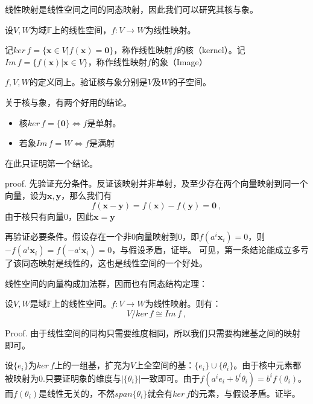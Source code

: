 

\begin{issues}
\issueTODO
\end{issues}

线性映射是线性空间之间的同态映射，因此我们可以研究其核与象。
\begin{definition}{}
设$V,W$为域$\mathbb F$上的线性空间，$f:V\rightarrow W$为线性映射。

记$ker\,f=\{\boldsymbol x\in V|f(\boldsymbol x)=\boldsymbol 0\}$，称作线性映射$f$的核（kernel）。记$Im\,f=\{f(\boldsymbol x)|\boldsymbol x\in V\}$，称作线性映射$f$的象（Image）
\end{definition}
\begin{exercise}{}
$f,V,W$的定义同上。验证核与象分别是$V$及$W$的子空间。
\end{exercise}
关于核与象，有两个好用的结论。
\begin{itemize}
\item 核$ker\,f=\{\boldsymbol 0\}\Longleftrightarrow f$是单射。
\item 若象$Im\,f=W\Longleftrightarrow f$是满射
\end{itemize}
在此只证明第一个结论。

proof.
先验证充分条件。反证该映射并非单射，及至少存在两个向量映射到同一个向量，设为$\boldsymbol{x,y}$，那么我们有
\begin{equation}
f(\boldsymbol{x}-\boldsymbol{y})=f(\boldsymbol x)-f(\boldsymbol y)=\boldsymbol 0~,
\end{equation}
由于核只有向量$0$，因此$\boldsymbol {x}=\boldsymbol{y}$

再验证必要条件。假设存在一个非$0$向量映射到$0$，即$f(a^i\boldsymbol x_i)=0$，则$-f(a^i\boldsymbol x_i)=f(-a^i\boldsymbol x_i)=0$，与假设矛盾，证毕。
可见，第一条结论能成立多亏了该同态映射是线性的，这也是线性空间的一个好处。

线性空间的向量构成加法群，因而也有同态结构定理：
\begin{theorem}{}
设$V,W$是域$\mathbb F$上的线性空间。$f:V\rightarrow W$为线性映射。则有：
\begin{equation}
V/ker \,f\cong Im\,f~,
\end{equation}
\end{theorem}
Proof.
由于线性空间的同构只需要维度相同，所以我们只需要构建基之间的映射即可。

设$\{e_i\}$为$ker\,f$上的一组基，扩充为$V$上全空间的基：$\{e_i\}\cup \{\theta_i\}$。由于核中元素都被映射为0.只要证明象的维度与$|\{\theta_i\}|$一致即可。由于$f(a^ie_i+b^i\theta_i)=b^if(\theta_i)$。而$f(\theta_i)$是线性无关的，不然$span\{\theta_i\}$就会有$ker\,f$的元素，与假设矛盾。证毕。

